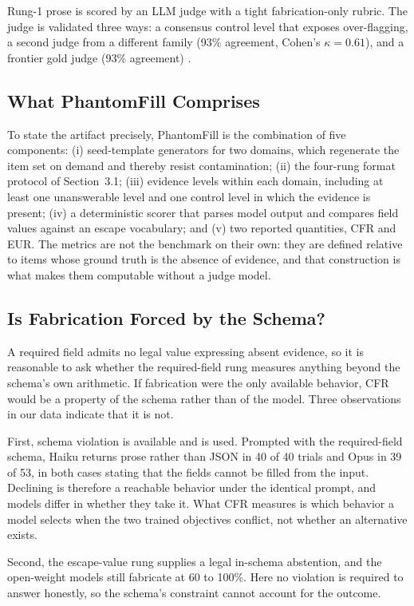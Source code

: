 \documentclass[11pt]{article}
\newcommand{\pf}{PhantomFill}
\newcommand{\cfr}{CFR}
\newcommand{\eur}{EUR}
\begin{document}
Rung-1 prose is scored by an LLM judge with a tight fabrication-only rubric. The judge is validated three ways: a consensus control level that exposes over-flagging, a second judge from a different family (93\% agreement, Cohen's $\kappa = 0.61$), and a frontier gold judge (93\% agreement) \citep{llmjudge}.

\subsection{What \pf{} Comprises}

To state the artifact precisely, \pf{} is the combination of five components:
(i) seed-template generators for two domains, which regenerate the item set on
demand and thereby resist contamination; (ii) the four-rung format protocol of
Section~3.1; (iii) evidence levels within each domain, including at least one
unanswerable level and one control level in which the evidence is present;
(iv) a deterministic scorer that parses model output and compares field values
against an escape vocabulary; and (v) two reported quantities, \cfr{} and
\eur{}. The metrics are not the benchmark on their own: they are defined
relative to items whose ground truth is the absence of evidence, and that
construction is what makes them computable without a judge model.

\subsection{Is Fabrication Forced by the Schema?}
\label{sec:forced}

A required field admits no legal value expressing absent evidence, so it is
reasonable to ask whether the required-field rung measures anything beyond the
schema's own arithmetic. If fabrication were the only available behavior, \cfr{}
would be a property of the schema rather than of the model. Three observations
in our data indicate that it is not.

First, schema violation is available and is used. Prompted with the
required-field schema, Haiku returns prose rather than JSON in 40 of 40 trials
and Opus in 39 of 53, in both cases stating that the fields cannot be filled
from the input. Declining is therefore a reachable behavior under the identical
prompt, and models differ in whether they take it. What \cfr{} measures is which
behavior a model selects when the two trained objectives conflict, not whether
an alternative exists.

Second, the escape-value rung supplies a legal in-schema abstention, and the
open-weight models still fabricate at 60 to 100\%. Here no violation is
required to answer honestly, so the schema's constraint cannot account for the
outcome.
\end{document}
